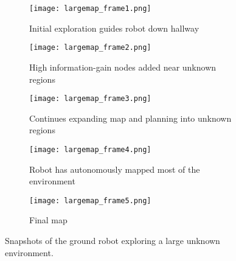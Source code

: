 \begin{figure*}[t]
	\centering
	\begin{subfigure}{0.49\textwidth}
	\centering
	\texttt{[image: largemap\_frame1.png]}
	\caption{Initial exploration guides robot down hallway\label{fig:largemap_frame1}}
	\end{subfigure}
	\begin{subfigure}{0.49\textwidth}
	\centering
	\texttt{[image: largemap\_frame2.png]}
	\caption{High information-gain nodes added near unknown regions\label{fig:largemap_frame2}}
	\end{subfigure}
	
	\vspace*{0.2in}
	
	\begin{subfigure}{0.49\textwidth}
	\centering
	\texttt{[image: largemap\_frame3.png]}
	\caption{Continues expanding map and planning into unknown regions\label{fig:largemap_frame3}}
	\end{subfigure}
	\begin{subfigure}{0.49\textwidth}
	\centering
	\texttt{[image: largemap\_frame4.png]}
	\caption{Robot has autonomously mapped most of the environment \label{fig:largemap_frame4}}
	\end{subfigure}
	
	\vspace*{0.2in}

	\begin{subfigure}{0.6\textwidth}
	\centering
	\texttt{[image: largemap\_frame5.png]}
	\caption{Final map \label{fig:largemap_frame5}}
	\end{subfigure}
	
	\caption{Snapshots of the ground robot exploring a large unknown environment. \label{fig:largemap_snapshots}}
\end{figure*}